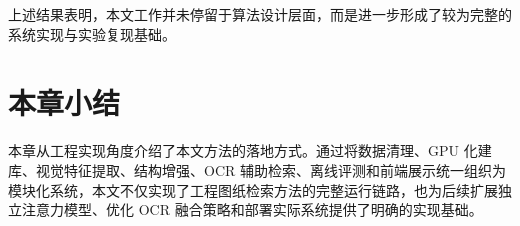上述结果表明，本文工作并未停留于算法设计层面，而是进一步形成了较为完整的系统实现与实验复现基础。

\section{本章小结}

本章从工程实现角度介绍了本文方法的落地方式。通过将数据清理、GPU 化建库、视觉特征提取、结构增强、OCR 辅助检索、离线评测和前端展示统一组织为模块化系统，本文不仅实现了工程图纸检索方法的完整运行链路，也为后续扩展独立注意力模型、优化 OCR 融合策略和部署实际系统提供了明确的实现基础。
